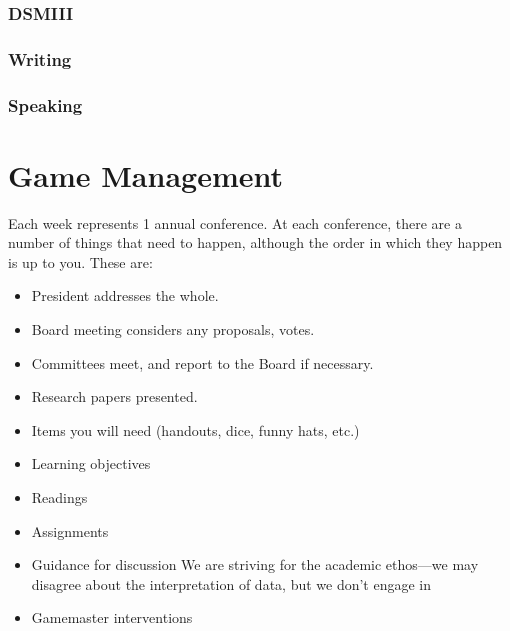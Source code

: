 \begin{refsection}
\subsection{DSMIII}
\label{dsmiii}

\subsection{Writing}
\label{writing}

\subsection{Speaking}
\label{speaking}

\pagebreak 

\chapter{Game Management}
\label{gamemanagement}

Each week represents 1 annual conference. At each conference, there are a number of things that need to happen, although the order in which they happen is up to you. These are:

\begin{itemize}
\item President addresses the whole.

\item Board meeting considers any proposals, votes.

\item Committees meet, and report to the Board if necessary.

\item Research papers presented.

\item Items you will need (handouts, dice, funny hats, etc.)

\item Learning objectives

\item Readings

\item Assignments

\item Guidance for discussion
We are striving for the academic ethos---we may disagree about the interpretation of data, but we don't engage in 

\item Gamemaster interventions

\end{itemize}


\end{refsection}
